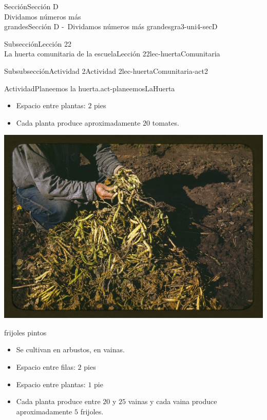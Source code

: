 \begin{sectionptx}{Sección}{{\Large Sección D\\}Dividamos números más\\grandes}{}{Sección D -~Dividamos números más grandes}{}{}{gra3-uni4-secD}
\begin{subsectionptx}{Subsección}{{\normalsize Lección 22\\[-0.05cm]}La huerta comunitaria de la escuela}{}{Lección 22}{}{}{lec-huertaComunitaria}
\begin{subsubsectionptx}{Subsubsección}{Actividad 2}{}{Actividad 2}{}{}{lec-huertaComunitaria-act2}
\begin{activity}{Actividad}{Planeemos la huerta.}{act-planeemosLaHuerta}
\begin{sidebyside}{2}{0.025}{0.025}{0.05}
\begin{sbspanel}{0.45}
\begin{itemize}[label=\textbullet]
\item{}Espacio entre plantas: \(2\) pies%
\item{}Cada planta produce aproximadamente \(20\) tomates.%
\end{itemize}
\end{sbspanel}%
\end{sidebyside}%
\begin{sidebyside}{2}{0.025}{0.025}{0.05}%
\begin{sbspanel}{0.45}%
\includegraphics[max width=0.8\linewidth, center]{external/jpg-source/3-4-D-22 Act2-frijoles-pintos.jpg}
%
\par
frijoles pintos%
%
\begin{itemize}[label=\textbullet]
\item{}Se cultivan en arbustos, en vainas.%
\item{}Espacio entre filas: \(2\) pies%
\item{}Espacio entre plantas: \(1\) pie%
\item{}Cada planta produce entre \(20\) y \(25\) vainas y cada vaina produce aproximadamente \(5\) frijoles.%
\end{itemize}
\end{sbspanel}%
\begin{sbspanel}{0.45}%

\end{sbspanel}
\end{sidebyside}
\end{activity}
\end{subsubsectionptx}
\end{subsectionptx}
\end{sectionptx}
